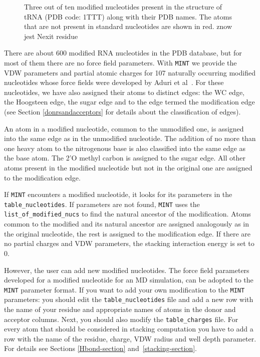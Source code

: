 \documentclass[12pt]{article}
\begin{document}
\begin{figure}[h!]
\begin{center}
\end{center}
\caption{Three out of ten modified nucleotides present in the structure of tRNA (PDB code: 1TTT) along with their PDB names. The atoms that are not present in standard nucleotides are shown in red. {\color{red} znow jest Nexit residue}}
\label{ModifiedNucleotides}
\end{figure}

There are about 600 modified RNA nucleotides in the PDB database, but for most of them there are no force field parameters. With {\tt MINT} we provide the VDW parameters and partial atomic charges for 107 naturally occurring modified nucleotides whose force fields were developed by Aduri et al~\cite{Aduri_2007}. For these nucleotides, we have also assigned their atoms to distinct edges: the WC edge, the Hoogsteen edge, the sugar edge and to the edge termed the modification edge (see Section \ref{donrsandacceptors} for details about the classification of edges). 

An atom in a modified nucleotide, common to the unmodified one, is assigned into the same edge as in the unmodified nucleotide. The addition of no more than one heavy atom to the nitrogenous base is also classified into the same edge as the base atom. The 2'O methyl carbon is assigned to the sugar edge. All other atoms present in the modified nucleotide but not in the original one are assigned to the modification edge.

If {\tt MINT} encounters a modified nucleotide, it looks for its parameters in the {\tt table\_nucleotides}. If parameters are not found, {\tt MINT} uses the \texttt{list\_of\_modified\_nucs} to find the natural ancestor of the modification. Atoms common to the modified and its natural ancestor are assigned analogously as in the original nucleotide, the rest is assigned to the modification edge. If there are no partial charges and VDW parameters, the stacking interaction energy is set to 0.

However, the user can add new modified nucleotides. The force field parameters developed for a modified nucleotide for an MD simulation, can be adopted to the {\tt MINT} parameter format. If you want to add your own modification to the {\tt MINT} parameters: you should edit the {\tt table\_nucleotides} file and add a new row with the name of your residue and appropriate names of atoms in the donor and acceptor columns. Next, you should also modify the \texttt{table\_charges} file. For every atom that should be considered in stacking computation you have to add a row with the name of the residue, charge, VDW radius and well depth parameter. For details see Sections \ref{Hbond-section} and~\ref{stacking-section}.
\end{document}
